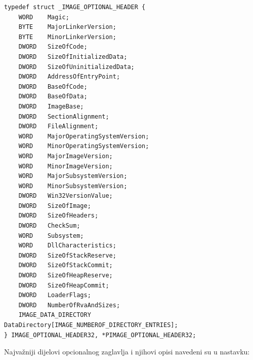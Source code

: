 \documentclass[times, utf8, diplomski, numeric]{fer}
\begin{document}
\begin{lstlisting}[frame=single, caption=IMAGE\_OPTIONAL\_HEADER struktura, label={lst:imgOptHeader}]
typedef struct _IMAGE_OPTIONAL_HEADER {
	WORD    Magic;
	BYTE    MajorLinkerVersion;
	BYTE    MinorLinkerVersion;
	DWORD   SizeOfCode;
	DWORD   SizeOfInitializedData;
	DWORD   SizeOfUninitializedData;
	DWORD   AddressOfEntryPoint;
	DWORD   BaseOfCode;
	DWORD   BaseOfData;
	DWORD   ImageBase;
	DWORD   SectionAlignment;
	DWORD   FileAlignment;
	WORD    MajorOperatingSystemVersion;
	WORD    MinorOperatingSystemVersion;
	WORD    MajorImageVersion;
	WORD    MinorImageVersion;
	WORD    MajorSubsystemVersion;
	WORD    MinorSubsystemVersion;
	DWORD   Win32VersionValue;
	DWORD   SizeOfImage;
	DWORD   SizeOfHeaders;
	DWORD   CheckSum;
	WORD    Subsystem;
	WORD    DllCharacteristics;
	DWORD   SizeOfStackReserve;
	DWORD   SizeOfStackCommit;
	DWORD   SizeOfHeapReserve;
	DWORD   SizeOfHeapCommit;
	DWORD   LoaderFlags;
	DWORD   NumberOfRvaAndSizes;
	IMAGE_DATA_DIRECTORY DataDirectory[IMAGE_NUMBEROF_DIRECTORY_ENTRIES];
} IMAGE_OPTIONAL_HEADER32, *PIMAGE_OPTIONAL_HEADER32;
\end{lstlisting}
Najvažniji dijelovi opcionalnog zaglavlja i njihovi opisi navedeni su u nastavku:
\end{document}
